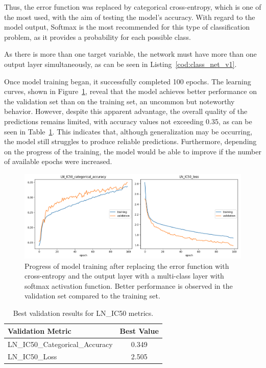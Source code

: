 Thus, the error function was replaced by categorical cross-entropy, which is one of the most used, with the aim of testing the model's accuracy. With regard to the model output, Softmax is the most recommended for this type of classification problem, as it provides a probability for each possible class. 

As there is more than one target variable, the network must have more than one output layer simultaneously, as can be seen in Listing~\ref{cod:class_net_v1}.

Once model training began, it successfully completed 100 epochs. The learning curves, shown in Figure~\ref{fig:train_class_net_v1}, reveal that the model achieves better performance on the validation set than on the training set, an uncommon but noteworthy behavior. However, despite this apparent advantage, the overall quality of the predictions remains limited, with accuracy values not exceeding 0.35, as can be seen in Table~\ref{tab:best_val_ln_ic50_metrics_net_class_v1}. This indicates that, although generalization may be occurring, the model still struggles to produce reliable predictions. Furthermore, depending on the progress of the training, the model would be able to improve if the number of available epochs were increased.

\begin{figure}[H]
    \centering
    \includegraphics[width=1\textwidth]{figures/neural_net_classification/classification_mse_v1.png}
    \caption{Progress of model training after replacing the error function with cross-entropy and the output layer with a multi-class layer with softmax activation function. Better performance is observed in the validation set compared to the training set.}
    \label{fig:train_class_net_v1}
\end{figure}

\begin{table}[H]
    \centering
    \begin{tabular}{|l|c|}
    \hline
    \textbf{Validation Metric} & \textbf{Best Value} \\
    \hline
    LN\_IC50\_Categorical\_Accuracy & 0.349 \\
    LN\_IC50\_Loss & 2.505 \\
    \hline
    \end{tabular}
    \caption{Best validation results for LN\_IC50 metrics.}
    \label{tab:best_val_ln_ic50_metrics_net_class_v1}
\end{table}

